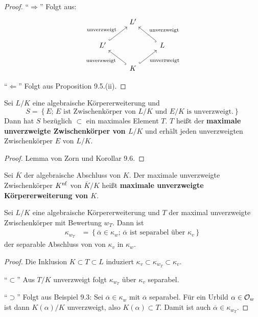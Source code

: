 \begin{proof}
	\enquote{$\Rightarrow$} Folgt aus:
	\[\begin{tikzcd}
	& L' & \\
	L' 
	\arrow[hook]{ur}{\text{unverzweigt}}
	& & L 
	\arrow[hook, swap]{ul}{\text{unverzweigt}}
	\\
	& K 
	\arrow[hook, swap]{ur}{\text{unverzweigt}}
	\arrow[hook]{ul}{\text{unverzweigt}}
	&
	\end{tikzcd}
	\]
	
	\enquote{$\Leftarrow$} Folgt aus Proposition 9.5.(ii).
\end{proof}


\begin{Bemdef}
	Sei $L/K$ eine algebraische Körpererweiterung und
	\[ S = \left\{
	E; \, E \text{ ist Zwischenkörper von $L/K$ und $E/K$ is unverzweigt}.
	\right\}
	\]
	Dann hat $S$ bezüglich $\subset$ ein maximales Element $T$. 
	$T$ heißt der \textbf{maximale unverzweigte Zwischenkörper von $L/K$} und erhält jeden unverzweigten  Zwischenkörper $E$ von $L/K$.
\end{Bemdef}

\begin{proof}
	Lemma von Zorn und Korollar 9.6.
\end{proof}

\begin{defi}
	Sei $\overline{K}$ der algebraische Abschluss von $K$. Der maximale unverzweigte Zwischenkörper $K^{\operatorname{nf}}$ von $\overline{K} /K$ heißt \textbf{maximale unverzweigte Körpererweiterung von $K$}.
\end{defi}

\begin{Prop}
	Sei $L/K$ eine algebraische Körpererweiterung und $T$ der maximal unverzweigte Zwischenkörper mit Bewertung $w_T$. Dann ist
	\begin{align*}
	\kappa_{w_T}
	&= \left\{
	\overline{\alpha} \in \kappa_w; \, \text{$\overline{\alpha}$ ist separabel über $\kappa_v$}
	\right\}
	\end{align*}
	der separable Abschluss von von $\kappa_v$ in $\kappa_w$.
\end{Prop}


\begin{proof}
	Die Inklusion $K\subset T \subset L$ induziert $\kappa_v \subset \kappa_{w_T} \subset \kappa_v$.
	
	\bigskip \enquote{$\subset$} Aus $T/K$ unverzweigt folgt $\kappa_{w_T}$ über $\kappa_v$ separabel.
	
	\bigskip \enquote{$\supset$} Folgt aus Beispiel 9.3: Sei $\overline{\alpha} \in \kappa_w$ mit $\overline{\alpha}$ separabel.
	Für ein Urbild $\alpha \in \mathcal{O}_w$ ist dann $K(\alpha)/K$  unverzweigt, also $K(\alpha) \subset T$.
	Damit ist auch $\overline{\alpha} \in \kappa_{w_T}$.
\end{proof}

